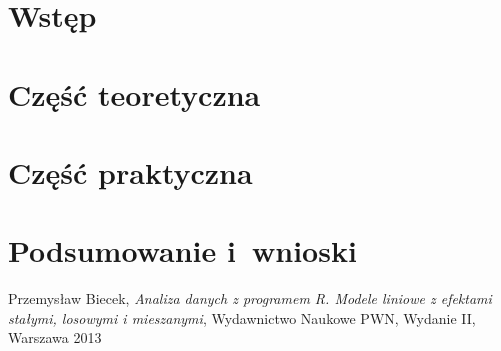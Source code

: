 \documentclass[12pt]{mwbk}
\theoremstyle{plain}
\theoremstyle{definition}
\theoremstyle{remark}
\begin{document}



\tableofcontents


\chapter*{Wstęp}
















\chapter[Część teoretyczna]{Część teoretyczna}

\chapter{Część praktyczna}


\chapter*{Podsumowanie i~wnioski}



\begin{thebibliography}{99}

 Przemysław Biecek, \emph{Analiza danych z programem R. Modele liniowe z efektami stałymi, losowymi i mieszanymi}, Wydawnictwo Naukowe PWN, Wydanie II, Warszawa 2013


\end{thebibliography}
\end{document}
